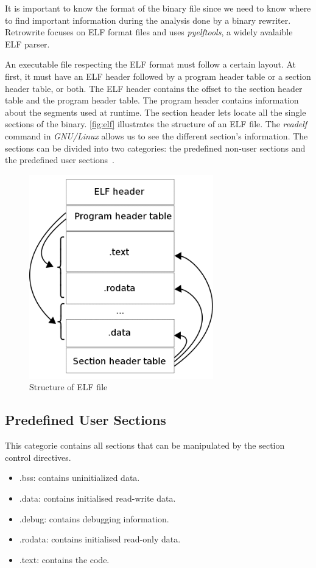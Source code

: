 \documentclass[a4paper,11pt,oneside]{report}
\newcommand{\sysname}{Retrowrite\xspace}
\begin{document}
It is important to know the format of the binary file since we need to know
where to find important information during the analysis done by a binary
rewriter. \sysname focuses on ELF format files and uses \textit{pyelftools}, a
widely avalaible ELF parser.


An executable file respecting the ELF format must follow a certain layout. At
first, it must have an ELF header followed by a program header table or a section
header table, or both. 
The ELF header contains the offset to the section header table and the program
header table. The program header contains information about the segments used
at runtime. The section header lets locate all the single sections of the
binary. \autoref{fig:elf} illustrates the structure of an ELF file. The
\textit{readelf}~\cite{readelfMan} command in \textit{GNU/Linux} allows us to
see the different section's information. The sections can be divided into two
categories: the predefined non-user sections and the predefined user
sections~\cite{sparc}.

\begin{figure}[H]
    \centering
    \includegraphics[width=8cm]{elf_structure.png} 
    \caption{Structure of ELF file}
    \label{fig:elf}
\end{figure}

\subsection{Predefined User Sections}
This categorie contains all sections that can be manipulated by the section
control directives.
\begin{itemize}
    \item    .bss: contains uninitialized data.
    \item    .data: contains initialised read-write data.
    \item    .debug: contains debugging information.
    \item    .rodata: contains initialised read-only data.
    \item    .text: contains the code.
\end{itemize}
\end{document}
